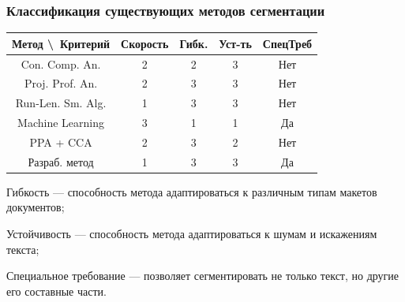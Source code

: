 \documentclass[gray]{beamer}
\begin{document}
\begin{frame}
    \frametitle{Классификация существующих методов сегментации}

    \begin{table}[H]
        \begin{center}
            \begin{tabular}{|c|c|c|c|c|}
                \hline
                \textbf{Метод \textbackslash\ Критерий} & \textbf{Скорость} & \textbf{Гибк.} & \textbf{Уст-ть} & \textbf{СпецТреб} \\ \hline
                Con. Comp. An.        & 2 & 2 & 3 & Нет \\ \hline
                Proj. Prof. An.        & 2 & 3 & 3 & Нет \\ \hline
                Run-Len. Sm. Alg. & 1 & 3 & 3 & Нет \\ \hline
                Machine Learning         & 3 & 1 & 1 & Да \\ \hline
                PPA + CCA  & 2 & 3 & 2 & Нет \\ \hline
                Разраб. метод    & 1 & 3 & 3 & Да \\ \hline
            \end{tabular}
        \end{center}
    \end{table}


    Гибкость --- способность метода адаптироваться к различным типам макетов документов;

    \vspace{0.2cm}

    Устойчивость --- способность метода адаптироваться к шумам и искажениям текста;

    \vspace{0.2cm}

    Специальное требование --- позволяет сегментировать не только текст, но другие его составные части.
\end{frame}
\end{document}
